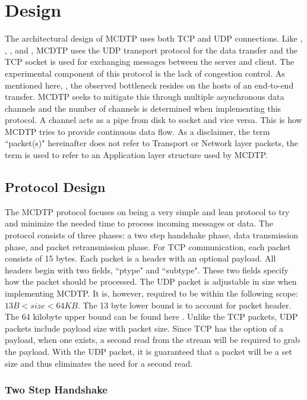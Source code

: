 \chapter{Design}

The architectural design of MCDTP uses both TCP and UDP connections. Like \cite{Meiss2007}, \cite{He2002}, \cite{Aspera2016}, and \cite{Fan2010}, MCDTP uses the UDP transport protocol for the data transfer and the TCP socket is used for exchanging messages between the server and client. The experimental component of this protocol is the lack of congestion control. As mentioned here, \cite{Aspera2016} \cite{Fan2010}, the observed bottleneck resides on the hosts of an end-to-end transfer. MCDTP seeks to mitigate this through multiple asynchronous data channels and the number of channels is determined when implementing this protocol. A channel acts as a pipe from disk to socket and vice versa. This is how MCDTP tries to provide continuous data flow. As a disclaimer, the term ``packet(s)" hereinafter does not refer to Transport or Network layer packets, the term is used to refer to an Application layer structure used by MCDTP.

\section{Protocol Design}\label{sec:proto-des}

The MCDTP protocol focuses on being a very simple and lean protocol to try and minimize the needed time to process incoming messages or data. The protocol consists of three phases: a two step handshake phase, data transmission phase, and packet retransmission phase. For TCP communication, each packet consists of 15 bytes. Each packet is a header with an optional payload. All headers begin with two fields, ``ptype" and ``subtype". These two fields specify how the packet should be processed. The UDP packet is adjustable in size when implementing MCDTP. It is, however, required to be within the following scope: $13B < size < 64KB$. The 13 byte lower bound is to account for packet header. The 64 kilobyte upper bound can be found here \cite{postel1981ip}. Unlike the TCP packets, UDP packets include payload size with packet size. Since TCP has the option of a payload, when one exists, a second read from the stream will be required to grab the payload. With the UDP packet, it is guaranteed that a packet will be a set size and thus eliminates the need for a second read.

\subsection{Two Step Handshake}

